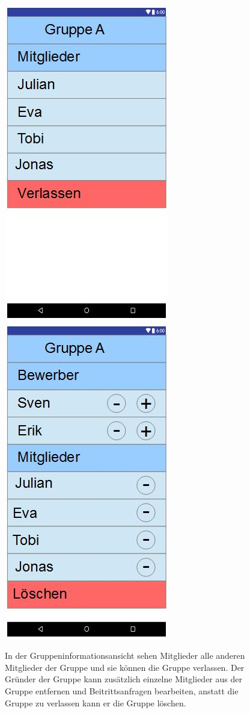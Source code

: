 \documentclass{scrartcl}
\begin{document}
	\newpage
	\begin{figure}[h]
	\includegraphics[width=.5\textwidth]{GUI_GruppeInfoNormal.jpg}
	\includegraphics[width=.5\textwidth]{GUI_GruppeInfoGruender.jpg}
	\caption{In der Gruppeninformationsansicht sehen Mitglieder alle anderen Mitglieder der Gruppe und sie können die Gruppe verlassen. Der Gründer der Gruppe kann zusätzlich einzelne Mitglieder aus der Gruppe entfernen und Beitrittsanfragen bearbeiten, anstatt die Gruppe zu verlassen kann er die Gruppe löschen.}
 	\end{figure}
\end{document}
